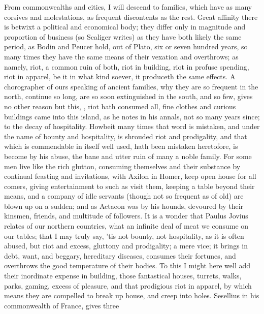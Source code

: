 From commonwealths and cities, I will descend to families, which have as many
corsives and molestations, as frequent discontents as the rest. Great affinity
there is betwixt a political and economical body; they differ only in magnitude
and proportion of business (so Scaliger writes) as they
have both likely the same period, as Bodin and
Peucer hold, out of Plato, six or seven hundred years, so
many times they have the same means of their vexation and overthrows; as
namely, riot, a common ruin of both, riot in building, riot in profuse
spending, riot in apparel, \etc{} be it in what kind soever, it produceth the
same effects. A chorographer of ours speaking 
of ancient families, why they are so frequent in the north, continue so long,
are so soon extinguished in the south, and so few, gives no other reason but
this, , riot hath consumed all, fine clothes and
curious buildings came into this island, as he notes in his annals, not so many
years since;  to the decay of
hospitality. Howbeit many times that word is mistaken, and under the name of
bounty and hospitality, is shrouded riot and prodigality, and that which is
commendable in itself well used, hath been mistaken heretofore, is become by
his abuse, the bane and utter ruin of many a noble family. For some men live
like the rich glutton, consuming themselves and their substance by continual
feasting and invitations, with Axilon in Homer, keep open
house for all comers, giving entertainment to such as visit them,
keeping a table beyond their means, and a company of idle
servants (though not so frequent as of old) are blown up on a sudden; and as
Actaeon was by his hounds, devoured by their kinsmen, friends, and multitude of
followers. It is a wonder that Paulus Jovius relates of our
northern countries, what an infinite deal of meat we consume on our tables;
that I may truly say, 'tis not bounty, not hospitality, as it is often abused,
but riot and excess, gluttony and prodigality; a mere vice; it brings in debt,
want, and beggary, hereditary diseases, consumes their fortunes, and overthrows
the good temperature of their bodies. To this I might here well add their
inordinate expense in building, those fantastical houses, turrets, walks,
parks, \etc{} gaming, excess of pleasure, and that prodigious riot in apparel,
by which means they are compelled to break up house, and creep into holes.
Sesellius in his commonwealth of France, gives three
